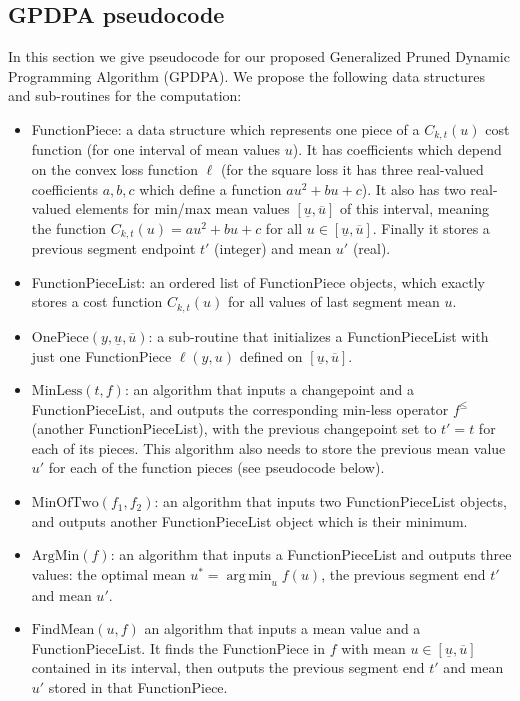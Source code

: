 \documentclass{article}
\newcommand{\FCC}{C}
\DeclareMathOperator*{\argmin}{arg\,min}
\begin{document}
\subsection{GPDPA pseudocode}
In this section we give pseudocode for our proposed Generalized Pruned
Dynamic Programming Algorithm (GPDPA). We propose the following data
structures and sub-routines for the computation:
\begin{itemize}
\item FunctionPiece: a data structure which represents one piece of a
  $C_{k,t}(u)$ cost function (for one interval of mean values $u$). It
  has coefficients which depend on the convex loss function $\ell$
  (for the square loss it has three real-valued coefficients $a,b,c$
  which define a function $au^2 + bu + c$). It also has two
  real-valued elements for min/max mean values
  $[\underline u, \overline u]$ of this interval, meaning the function
  $C_{k,t}(u)=au^2 + bu + c$ for all
  $u\in[\underline u, \overline u]$. Finally it stores a previous
  segment endpoint $t'$ (integer) and mean $u'$ (real).
\item FunctionPieceList: an ordered list of FunctionPiece objects,
  which exactly stores a cost function $\FCC_{k,t}(u)$ for all values
  of last segment mean $u$.
\item $\text{OnePiece}(y, \underline u, \overline u)$: a sub-routine
  that initializes a FunctionPieceList with just one FunctionPiece
  $\ell(y, u)$ defined on $[\underline u, \overline u]$.
\item $\text{MinLess}(t, f)$: an algorithm that inputs a changepoint
  and a FunctionPieceList, and outputs the corresponding min-less
  operator $f^\leq$ (another FunctionPieceList), with the previous
  changepoint set to $t'=t$ for each of its pieces. This algorithm
  also needs to store the previous mean value $u'$ for each of the
  function pieces (see pseudocode below). 
\item $\text{MinOfTwo} (f_1, f_2)$: an algorithm that inputs two
  FunctionPieceList objects, and outputs another FunctionPieceList
  object which is their minimum. 
\item $\text{ArgMin}(f)$: an algorithm that inputs a FunctionPieceList
  and outputs three values: the optimal mean $u^*=\argmin_u f(u)$, the
  previous segment end $t'$ and mean $u'$.
\item $\text{FindMean}(u, f)$ an algorithm that inputs a mean value
  and a FunctionPieceList. It finds the FunctionPiece in $f$ with mean
  $u\in[\underline u, \overline u]$ contained in its interval, then
  outputs the previous segment end $t'$ and mean $u'$ stored in that
  FunctionPiece.
\end{itemize}
\end{document}
